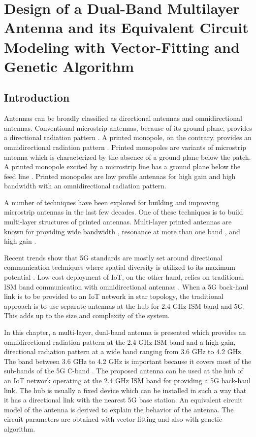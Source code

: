 \chapter{Design of a Dual-Band Multilayer Antenna and its Equivalent Circuit Modeling with Vector-Fitting and Genetic Algorithm}
\label{chap:chap4}
\section{Introduction}\label{c4sec:intro}
Antennas can be broadly classified as directional antennas and omnidirectional antennas. Conventional microstrip antennas, because of its ground plane, provides a directional radiation pattern \cite{handbook}. A printed monopole, on the contrary, provides an omnidirectional radiation pattern \cite{pma_stripline, pma_dualband}. Printed monopoles are variants of microstrip antenna which is characterized by the absence of a ground plane below the patch. A printed monopole excited by a microstrip line has a ground plane below the feed line \cite{pma_stripline}. Printed monopoles are low profile antennas for high gain and high bandwidth with an omnidirectional radiation pattern\cite{PMA01}.

A number of techniques have been explored for building and improving microstrip antennas in the last few decades. One of these techniques is to build multi-layer structures of printed antennas. Multi-layer printed antennas are known for providing wide bandwidth \cite{ML_WideBand01}, resonance at more than one band \cite{ML_DualBand01, ML_DualBand02}, and high gain \cite{ML_high_gain_parasitic_slot}.

Recent trends show that 5G standards are mostly set around directional communication techniques where spatial diversity is utilized to its maximum potential \cite{5G_surv1, 5G_surv2}. Low cost deployment of IoT, on the other hand, relies on traditional ISM band communication with omnidirectional antennas \cite{iot-ant1,iot-ant2,iot-ant3}. When a 5G back-haul link is to be provided to an IoT network in star topology, the traditional approach is to use separate antennas at the hub for 2.4 GHz ISM band and 5G. This adds up to the size and complexity of the system.

In this chapter, a multi-layer, dual-band antenna is presented which provides an omnidirectional radiation pattern at the 2.4 GHz ISM band and a high-gain, directional radiation pattern at a wide band ranging from 3.6 GHz to 4.2 GHz. The band between 3.6 GHz to 4.2 GHz is important because it covers most of the sub-bands of the 5G C-band \cite{5G_tutorial, 5G_standards}. The proposed antenna can be used at the hub of an IoT network operating at the 2.4 GHz ISM band for providing a 5G back-haul link. The hub is usually a fixed device which can be installed in such a way that it has a directional link with the nearest 5G base station. An equivalent circuit model of the antenna is derived to explain the behavior of the antenna. The circuit parameters are obtained with vector-fitting and also with genetic algorithm.

